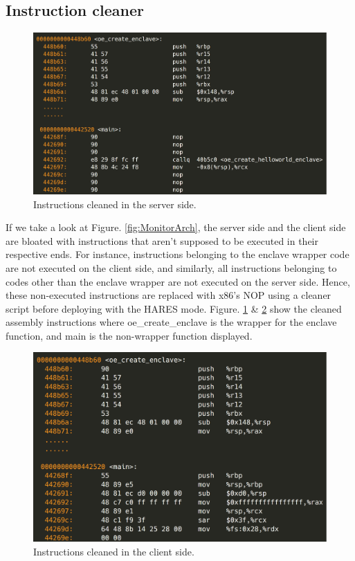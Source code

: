 \documentclass[article, doublespace,nopageskip]{VTthesis} %
\newcommand{\monitor}{HARES }
\begin{document}
    \subsection{Instruction cleaner} \label{ase:inst_cleaner}
    \begin{figure}[htb]
        \centering
        \includegraphics[scale=0.7]{figures/server_instruction_cleaned.png}
        \caption{Instructions cleaned in the server side.} 
        \label{fig:server_instructions}
    \end{figure}
    
    If we take a look at Figure. \ref{fig:MonitorArch}, the server side and the client side are bloated with instructions that aren't supposed to be executed in their respective ends. For instance, instructions belonging to the enclave wrapper code are not executed on the client side, and similarly, all instructions belonging to codes other than the enclave wrapper are not executed on the server side. Hence, these non-executed instructions are replaced with x86's NOP using a cleaner script before deploying with the \monitor mode. Figure. \ref{fig:server_instructions} \& \ref{fig:client_instructions} show the cleaned assembly instructions where oe\_create\_enclave is the wrapper for the enclave function, and main is the non-wrapper function displayed.

    \begin{figure}[htb]
        \centering
        \includegraphics[scale=0.8]{figures/client_instruction_cleaned.png}
        \caption{Instructions cleaned in the client side.} 
        \label{fig:client_instructions}
    \end{figure}
\end{document}
